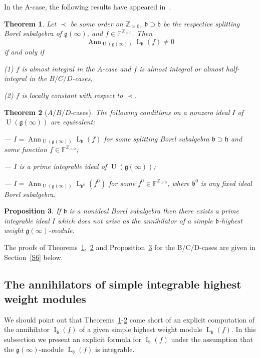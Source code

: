 \documentclass{emsprocart}
\newtheorem{theorem}{Theorem}[section]
\newtheorem{proposition}[theorem]{Proposition}
\begin{document}
In the A-case, the following results have appeared in~\cite{PP2}.
\begin{theorem}\label{1Tbcd} Let $\prec$ be some order on $\mathbb Z_{>0}$, $\mathfrak b\supset\mathfrak h$ be the respective splitting Borel subalgebra of $\mathfrak g(\infty)$, and $f\in\mathbb F^{\mathbb Z_{>0}}$. Then $$\operatorname{Ann}_{\operatorname{U}(\mathfrak g(\infty))} \operatorname{L}_{\mathfrak b}(f)\ne 0$$ if and only if

(1) $f$ is almost integral in the $A$-case and $f$ is almost integral or almost half-integral in the $B/C/D$-cases,

(2) $f$ is locally constant with respect to $\prec$.\end{theorem}
\begin{theorem}[$A/B/D$-cases]\label{2T} The following conditions on a nonzero ideal $I$ of $\operatorname{U}(\mathfrak g(\infty))$ are equivalent:

--- $I=\operatorname{Ann}_{\operatorname{U}(\mathfrak g(\infty))} \operatorname{L}_{\mathfrak b}(f)$ for some splitting Borel subalgebra $\mathfrak b\supset\mathfrak h$ and some function $f\in\mathbb F^{\mathbb Z_{>0}}$;

--- $I$ is a prime integrable ideal of $\operatorname{U}(\mathfrak g(\infty))$;

--- $I=\operatorname{Ann}_{\operatorname{U}(\mathfrak g(\infty))} \operatorname{L}_{\mathfrak b^0}(f^0)$ for some $f^0\in\mathbb F^{\mathbb Z_{>0}}$, where $\mathfrak b^0$ is any fixed ideal Borel subalgebra.\\
\end{theorem}
\begin{proposition}\label{Pp} If $\mathfrak b$ is a nonideal Borel subalgebra then there exists a prime integrable ideal $I$ which does not arise as the annihilator of a simple $\mathfrak b$-highest weight $\mathfrak g(\infty)$-module.\end{proposition}

The proofs of Theorems~\ref{1Tbcd},~\ref{2T} and Proposition~\ref{Pp} for the B/C/D-cases are given in Section~\ref{S6} below. 


\subsection{The annihilators of simple integrable highest weight modules} We should point out that Theorems~\ref{1Tbcd}-\ref{2T} come short of an explicit computation of the annihilator $\operatorname{I}_\mathfrak b(f)$ of a given simple highest weight module $\operatorname{L}_\mathfrak b(f)$. 
In this subsection we present an explicit formula for $\operatorname{I}_\mathfrak b(f)$ under the assumption that the
 $\mathfrak g(\infty)$-module $\operatorname{L}_\mathfrak b(f)$  is integrable.
\end{document}
